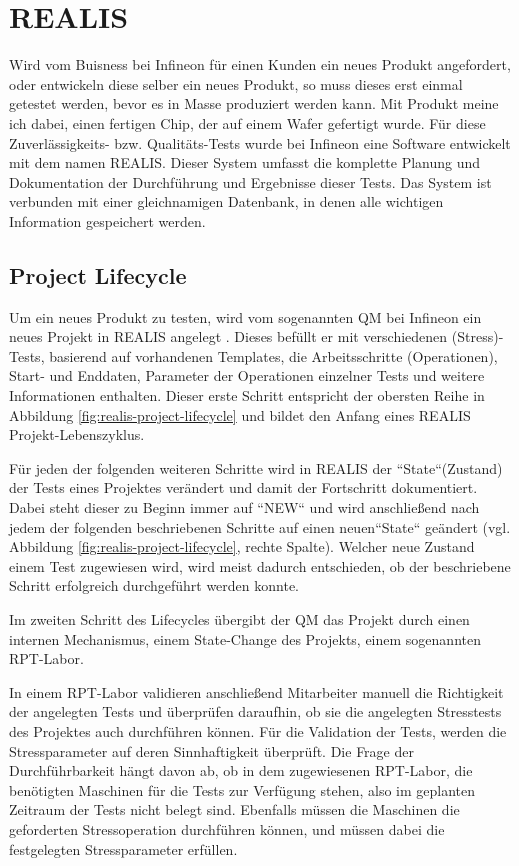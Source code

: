 \section{REALIS}\label{Sec:REALIS}
Wird vom Buisness bei Infineon für einen Kunden ein neues Produkt angefordert, oder entwickeln diese selber ein neues Produkt, so muss dieses erst einmal getestet werden, bevor es in Masse produziert werden kann. Mit Produkt meine ich dabei, einen fertigen Chip, der auf einem Wafer gefertigt wurde. Für diese Zuverlässigkeits- bzw. Qualitäts-Tests wurde bei Infineon eine Software entwickelt mit dem namen \gls{REALIS}. Dieser System umfasst die komplette Planung und Dokumentation der Durchführung und Ergebnisse dieser Tests. Das System ist verbunden mit einer gleichnamigen Datenbank, in denen alle wichtigen Information gespeichert werden. 

\subsection{Project Lifecycle}\label{Subsec:project-lifecycle}
Um ein neues Produkt zu testen, wird vom sogenannten \gls{QM} bei Infineon ein neues Projekt in \gls{REALIS} angelegt . Dieses befüllt er mit verschiedenen (Stress)-Tests, basierend auf vorhandenen Templates, die Arbeitsschritte (Operationen), Start- und Enddaten, Parameter der Operationen einzelner Tests und weitere Informationen enthalten. Dieser erste Schritt entspricht der obersten Reihe in Abbildung \ref{fig:realis-project-lifecycle} und bildet den Anfang eines REALIS Projekt-Lebenszyklus. 

Für jeden der folgenden weiteren Schritte wird in \gls{REALIS} der ``State``(Zustand) der Tests eines Projektes verändert und damit der Fortschritt dokumentiert. Dabei steht dieser zu Beginn immer auf  ``NEW`` und wird anschließend nach jedem der folgenden beschriebenen Schritte auf einen neuen``State`` geändert (vgl. Abbildung \ref{fig:realis-project-lifecycle}, rechte Spalte). Welcher neue Zustand einem Test zugewiesen wird, wird meist dadurch entschieden, ob der beschriebene Schritt erfolgreich durchgeführt werden konnte.

Im zweiten Schritt des Lifecycles übergibt der \gls{QM} das Projekt durch einen internen Mechanismus, einem State-Change des Projekts, einem sogenannten  \gls{RPT}-Labor. 

In einem \gls{RPT}-Labor validieren anschließend Mitarbeiter manuell die Richtigkeit der angelegten Tests und überprüfen daraufhin, ob sie die angelegten Stresstests des Projektes auch durchführen können. 
Für die Validation der Tests, werden die Stressparameter auf deren Sinnhaftigkeit überprüft. Die Frage der Durchführbarkeit hängt davon ab, ob in dem zugewiesenen \gls{RPT}-Labor, die benötigten Maschinen für die Tests zur Verfügung stehen, also im geplanten Zeitraum der Tests nicht belegt sind. Ebenfalls müssen die Maschinen die geforderten Stressoperation durchführen können, und müssen dabei die festgelegten Stressparameter erfüllen.


